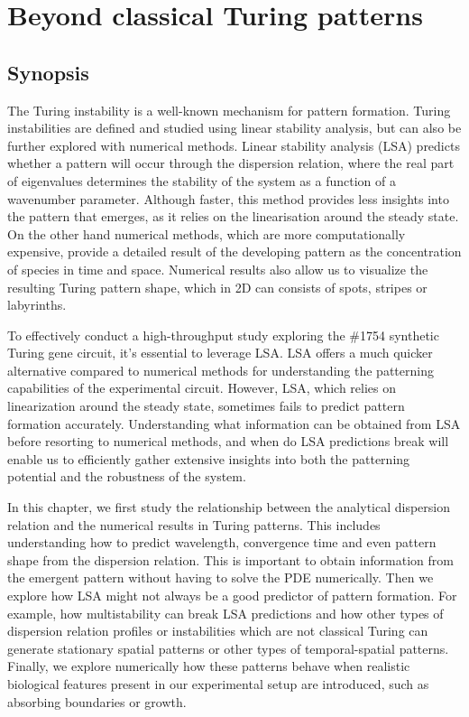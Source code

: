 \chapter{Beyond classical Turing patterns}\label{Chapter 1}
\section{Synopsis}
The Turing instability is a well-known mechanism for pattern formation.
Turing instabilities are defined and studied using linear stability analysis, but can also be further explored with numerical methods.
Linear stability analysis (LSA) predicts whether a pattern will occur through the dispersion relation, where the real part of eigenvalues determines the stability of the system as a function of a wavenumber parameter.
Although faster, this method provides less insights into the pattern that emerges, as it relies on the linearisation around the steady state.
On the other hand numerical methods, which are more computationally expensive, provide a detailed result of the developing pattern as the concentration of species in time and space.
Numerical results also allow us to visualize the resulting Turing pattern shape, which in 2D can consists of spots, stripes or labyrinths.

To effectively conduct a high-throughput study exploring the \#1754 synthetic Turing gene circuit, it's essential to leverage LSA.
LSA offers a much quicker alternative compared to numerical methods for understanding the patterning capabilities of the experimental circuit.
However, LSA, which relies on linearization around the steady state, sometimes fails to predict pattern formation accurately.
Understanding what information can be obtained from LSA before resorting to numerical methods, and when do LSA predictions break will enable us to efficiently gather extensive insights into both the patterning potential and the robustness of the system.

In this chapter, we first study the relationship between the analytical dispersion relation and the numerical results in Turing patterns.
This includes understanding how to predict wavelength,
convergence time and even pattern shape from the dispersion relation.
This is important to obtain information from the emergent pattern without having to solve the PDE numerically.
Then we explore how LSA might not always be a good predictor of pattern formation.
For example, how multistability can break LSA predictions and how other types of dispersion relation profiles or instabilities which are not classical Turing can generate stationary spatial patterns or other types of temporal-spatial patterns.
Finally, we explore numerically how these patterns behave when realistic biological features present in our experimental setup are introduced, such as absorbing boundaries or growth.



